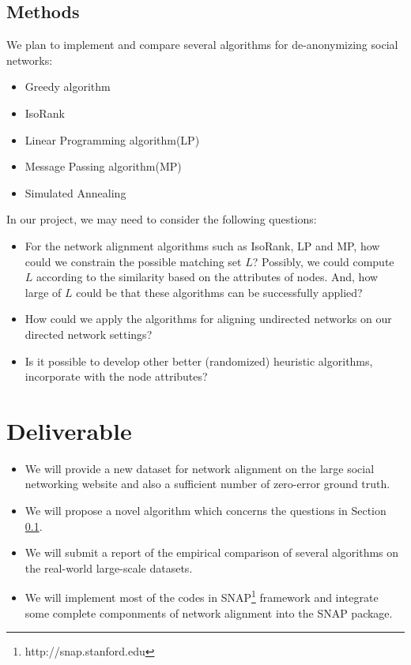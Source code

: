 \documentclass[11pt,letterpaper]{article}
\begin{document}
\subsection{Methods}
\label{methodsection}
We plan to implement and compare several algorithms for de-anonymizing social networks:
\begin{itemize}
	\item
		Greedy algorithm  \cite{Narayanan2009}
	\item
		IsoRank \cite{Singh2007}
	\item 
		Linear Programming algorithm(LP) \cite{Klau2009}
	\item
		Message Passing algorithm(MP) \cite{Bayati2009a,Pache2012}
	\item
		Simulated Annealing \cite{Kreitmann2011}
\end{itemize}
In our project, we may need to consider the following questions:
\begin{itemize}
	\item
		For the network alignment algorithms such as IsoRank, LP and MP, how could we constrain the possible matching set $L$? Possibly, we could compute $L$ according to the similarity based on the attributes of nodes. And, how large of $L$ could be that these algorithms can be successfully applied?
	\item
		How could we apply the algorithms for aligning undirected networks on our directed network settings?
	\item
		Is it possible to develop other better (randomized) heuristic algorithms, incorporate with the node attributes?
\end{itemize}

\section{Deliverable}
\begin{itemize}
\item
We will provide a new dataset for network alignment on the large social networking website and also a sufficient number of zero-error ground truth. 

\item We will propose a novel algorithm which concerns the questions in Section \ref{methodsection}.

\item
We will submit a report of the empirical comparison of several algorithms on the real-world large-scale datasets. 

\item
We will implement most of the codes in SNAP\footnote{http://snap.stanford.edu} framework and integrate some complete componments of network alignment into the SNAP package.  
\end{itemize}


\end{document}
